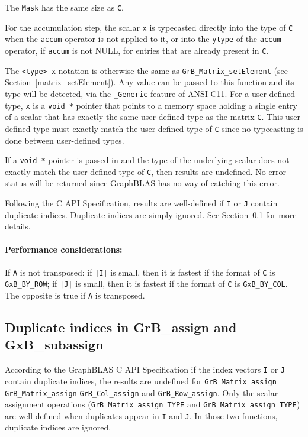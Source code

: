 \documentclass[12pt]{article}
\begin{document}
The \verb'Mask' has the same size as \verb'C'.

For the accumulation step, the scalar \verb'x' is typecasted directly into the
type of \verb'C' when the \verb'accum' operator is not applied to it, or into
the \verb'ytype' of the \verb'accum' operator, if \verb'accum' is not NULL, for
entries that are already present in \verb'C'.

The \verb'<type> x' notation is otherwise the same as
\verb'GrB_Matrix_setElement' (see Section~\ref{matrix_setElement}).  Any value
can be passed to this function and its type will be detected, via the
\verb'_Generic' feature of ANSI C11.  For a user-defined type, \verb'x' is a
\verb'void *' pointer that points to a memory space holding a single entry of a
scalar that has exactly the same user-defined type as the matrix \verb'C'.
This user-defined type must exactly match the user-defined type of \verb'C'
since no typecasting is done between user-defined types.

If a \verb'void *' pointer is passed in and the type of the underlying scalar
does not exactly match the user-defined type of \verb'C', then results are
undefined.  No error status will be returned since GraphBLAS has no way of
catching this error.

Following the C API Specification, results are well-defined if \verb'I' or
\verb'J' contain duplicate indices.  Duplicate indices are simply ignored.  See
Section~\ref{duplicates} for more details.

\paragraph{\bf Performance considerations:} %
If \verb'A' is not transposed: if \verb'|I|' is small, then it is fastest if
the format of \verb'C' is \verb'GxB_BY_ROW'; if \verb'|J|' is small, then it is
fastest if the format of \verb'C' is \verb'GxB_BY_COL'.  The opposite is true
if \verb'A' is transposed.

\newpage
\subsection{Duplicate indices in {\sf GrB\_assign} and {\sf GxB\_subassign}}
\label{duplicates}

According to the GraphBLAS C API Specification if the index vectors \verb'I' or
\verb'J' contain duplicate indices, the results are undefined for
\verb'GrB_Matrix_assign' \verb'GrB_Matrix_assign' \verb'GrB_Col_assign' and
\verb'GrB_Row_assign'.  Only the scalar assignment operations
(\verb'GrB_Matrix_assign_TYPE' and \verb'GrB_Matrix_assign_TYPE') are
well-defined when duplicates appear in \verb'I' and \verb'J'.  In those two
functions, duplicate indices are ignored.
\end{document}
